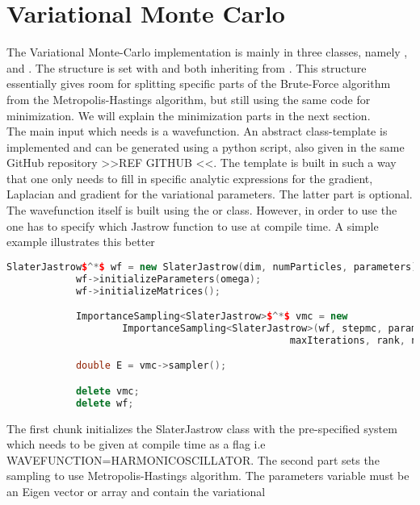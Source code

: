 \section{Variational Monte Carlo}
    The Variational Monte-Carlo implementation is mainly in three classes,
    namely ,  and
    . The structure is set with
     and  both inheriting
    from . This structure essentially gives room for splitting
    specific parts of the Brute-Force algorithm from the Metropolis-Hastings
    algorithm, but still using the same code for minimization. We will explain
    the minimization parts in the next section. \\ 
    The main input which  needs is a wavefunction. An abstract
    class-template is implemented and can be generated using a python script,
    also given in the same GitHub repository >>REF GITHUB <<. The template is
    built in such a way that one only needs to fill in specific analytic
    expressions for the gradient, Laplacian and gradient for the variational
    parameters. The latter part is optional. \\ 
    The wavefunction itself is built using the  or
     class. However, in order to use the
     one has to specify which Jastrow function to use
    at compile time. A simple example illustrates this better
        \begin{lstlisting}[language=C++, style=ccstyle]
            SlaterJastrow$^*$ wf = new SlaterJastrow(dim, numParticles, parameters);
            wf->initializeParameters(omega);
            wf->initializeMatrices();

            ImportanceSampling<SlaterJastrow>$^*$ vmc = new
                    ImportanceSampling<SlaterJastrow>(wf, stepmc, parameters,
                                                 maxIterations, rank, numProcs);

            double E = vmc->sampler();

            delete vmc;
            delete wf;
        \end{lstlisting}
    The first chunk initializes the SlaterJastrow class with the pre-specified
    system which needs to be given at compile time as a flag i.e
    WAVEFUNCTION=HARMONICOSCILLATOR. The second part sets the sampling to use
    Metropolis-Hastings algorithm. The parameters variable must be an
    Eigen\cite{eigenweb} vector or array and contain the variational
